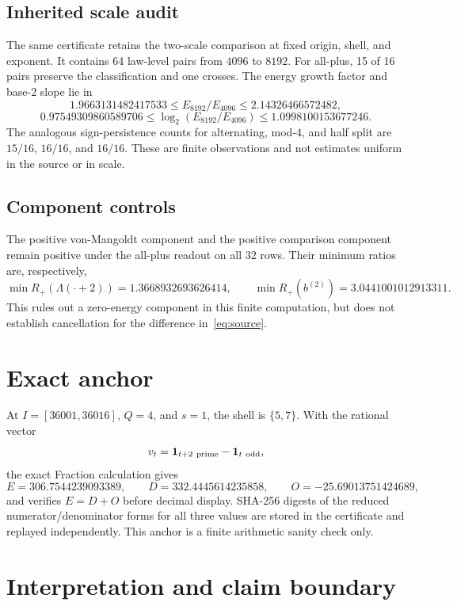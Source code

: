 \documentclass[10pt]{article}
\newcommand{\ind}{\mathbf 1}
\begin{document}
\subsection{Inherited scale audit}

The same certificate retains the two-scale comparison at fixed origin, shell,
and exponent.  It contains 64 law-level pairs from $4096$ to $8192$.  For
all-plus, 15 of 16 pairs preserve the classification and one crosses.  The
energy growth factor and base-2 slope lie in
\[
 1.9663131482417533\leq E_{8192}/E_{4096}
 \leq2.14326466572482,
\]
\[
 0.97549309860589706\leq
 \log_2(E_{8192}/E_{4096})
 \leq1.0998100153677246.
\]
The analogous sign-persistence counts for alternating, mod-$4$, and half
split are $15/16$, $16/16$, and $16/16$.  These are finite observations and
not estimates uniform in the source or in scale.

\subsection{Component controls}

The positive von-Mangoldt component and the positive comparison component
remain positive under the all-plus readout on all 32 rows.  Their minimum
ratios are, respectively,
\[
 \min R_+(\Lambda(\cdot+2))=1.3668932693626414,\qquad
 \min R_+(b^{(2)})=3.0441001012913311.
\]
This rules out a zero-energy component in this finite computation, but does
not establish cancellation for the difference in~\eqref{eq:source}.

\section{Exact anchor}

At $I=[36001,36016]$, $Q=4$, and $s=1$, the shell is $\{5,7\}$.  With the
rational vector
\[
 v_t=\ind_{t+2\ {\rm prime}}-\ind_{t\ {\rm odd}},
\]
the exact Fraction calculation gives
\[
 E=306.7544239093389,\qquad
 D=332.4445614235858,\qquad
 O=-25.69013751424689,
\]
and verifies $E=D+O$ before decimal display.  SHA-256 digests of the reduced
numerator/denominator forms for all three values are stored in the
certificate and replayed independently.  This anchor is a finite arithmetic
sanity check only.

\section{Interpretation and claim boundary}
\end{document}
